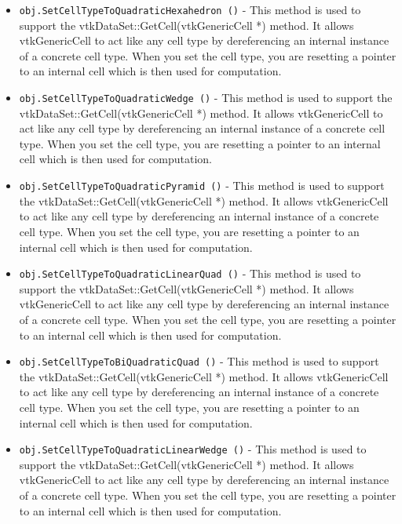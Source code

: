 \begin{itemize}
\item  \verb|obj.SetCellTypeToQuadraticHexahedron ()| -  This method is used to support the vtkDataSet::GetCell(vtkGenericCell *)
 method. It allows vtkGenericCell to act like any cell type by
 dereferencing an internal instance of a concrete cell type. When
 you set the cell type, you are resetting a pointer to an internal
 cell which is then used for computation.

\item  \verb|obj.SetCellTypeToQuadraticWedge ()| -  This method is used to support the vtkDataSet::GetCell(vtkGenericCell *)
 method. It allows vtkGenericCell to act like any cell type by
 dereferencing an internal instance of a concrete cell type. When
 you set the cell type, you are resetting a pointer to an internal
 cell which is then used for computation.

\item  \verb|obj.SetCellTypeToQuadraticPyramid ()| -  This method is used to support the vtkDataSet::GetCell(vtkGenericCell *)
 method. It allows vtkGenericCell to act like any cell type by
 dereferencing an internal instance of a concrete cell type. When
 you set the cell type, you are resetting a pointer to an internal
 cell which is then used for computation.

\item  \verb|obj.SetCellTypeToQuadraticLinearQuad ()| -  This method is used to support the vtkDataSet::GetCell(vtkGenericCell *)
 method. It allows vtkGenericCell to act like any cell type by
 dereferencing an internal instance of a concrete cell type. When
 you set the cell type, you are resetting a pointer to an internal
 cell which is then used for computation.

\item  \verb|obj.SetCellTypeToBiQuadraticQuad ()| -  This method is used to support the vtkDataSet::GetCell(vtkGenericCell *)
 method. It allows vtkGenericCell to act like any cell type by
 dereferencing an internal instance of a concrete cell type. When
 you set the cell type, you are resetting a pointer to an internal
 cell which is then used for computation.

\item  \verb|obj.SetCellTypeToQuadraticLinearWedge ()| -  This method is used to support the vtkDataSet::GetCell(vtkGenericCell *)
 method. It allows vtkGenericCell to act like any cell type by
 dereferencing an internal instance of a concrete cell type. When
 you set the cell type, you are resetting a pointer to an internal
 cell which is then used for computation.


\end{itemize}
